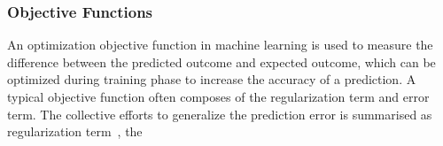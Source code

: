 \subsubsection{Objective Functions}
An optimization objective function in machine learning is used to measure the difference between the predicted outcome and expected outcome, which can be optimized during training phase to increase the accuracy of a prediction. A typical objective function often composes of the regularization term and error term. The collective efforts to generalize the prediction error is summarised as regularization term~\cite{goodfellow_2015}, the  
